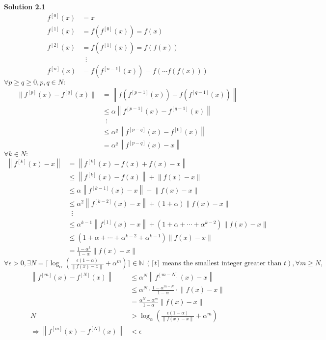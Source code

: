 \documentclass[fleqn, 10.5pt, a4paper]{article}
\def\N{{\mathbb N}}
\theoremstyle{definition}
\numberwithin{equation}{section}
\newcommand{\norm}[1]{\left\lVert#1\right\rVert}
\begin{document}
\noindent \textbf {Solution 2.1} \\
\begin{align*}
	f^{[0]}(x) &= x \\
	f^{[1]}(x) &= f\left(f^{[0]}(x)\right) = f(x) \\
	f^{[2]}(x) &= f\left(f^{[1]}(x)\right) = f(f(x)) \\
			   & \;\; \vdots \\
	f^{[n]}(x) &= f\left(f^{[n-1]}(x)\right) = f(\cdots f(f(x)))		  
\end{align*}
$\forall p\geq q\geq 0, p,q\in N:$
\begin{align*}
	\|f^{[p]}(x)-f^{[q]}(x)\| &= \norm{f\left(f^{[p-1]}(x)\right)-f\left(f^{[q-1]}(x)\right)} \\
	&\leq \alpha \norm{f^{[p-1]}(x)-f^{[q-1]}(x)} \\
	& \; \; \vdots \\
	&\leq \alpha^{q} \norm{f^{[p-q]}(x)-f^{[0]}(x)} \\
	&= \alpha^q \norm{f^{[p-q]}(x)-x}
\end{align*}
$\forall k \in N:$
\begin{align*}
	\norm{f^{[k]}(x)-x} &= \norm{f^{[k]}(x)-f(x)+f(x)-x} \\
	&\leq \norm{f^{[k]}(x)-f(x)}+\norm{f(x)-x} \\
	&\leq \alpha\norm{f^{[k-1]}(x)-x}+\norm{f(x)-x} \\
	&\leq \alpha^2\norm{f^{[k-2]}(x)-x}+\left(1+\alpha\right)\norm{f(x)-x} \\
	& \;\; \vdots \\
	&\leq \alpha^{k-1}\norm{f^{[1]}(x)-x} + \left(1+\alpha+\cdots+\alpha^{k-2}\right)\norm{f(x)-x} \\
	&\leq \left(1+\alpha+\cdots+\alpha^{k-2}+\alpha^{k-1}\right)\norm{f(x)-x} \\
	&=\frac{1-\alpha^k}{1-\alpha}\norm{f(x)-x}
\end{align*}
$\forall \epsilon>0,\exists N = \bigg\lceil \log_\alpha\left(\frac{\epsilon(1-\alpha)}{\norm{f(x)-x}}+\alpha^m\right) \bigg\rceil \in \N \ (\lceil t \rceil \text{ means the smallest integer greater than } t),\forall m \geq N,$
\begin{align*}
\norm{f^{[m]}(x)-f^{[N]}(x)} 
&\leq \alpha^N \norm{f^{[m-N]}(x)-x} \\
&\leq \alpha^N \cdot \frac{1-\alpha^{m-N}}{1-\alpha} \cdot \norm{f(x)-x} \\
&= \frac{\alpha^N-\alpha^{m}}{1-\alpha} \norm{f(x)-x} \\
N&>\log_\alpha\left(\frac{\epsilon(1-\alpha)}{\norm{f(x)-x}}+\alpha^m\right) \\
\Rightarrow \norm{f^{[m]}(x)-f^{[N]}(x)} &< \epsilon
\end{align*}
\end{document}
